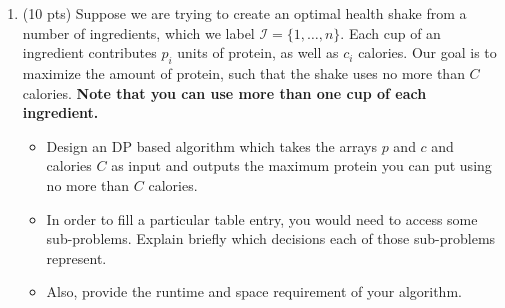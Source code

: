\documentclass[12pt]{article}
\theoremstyle{remark}
\begin{document}
\begin{enumerate}
    
    


\pagebreak



\item (10 pts) Suppose we are trying to create an optimal health shake from a number of ingredients, which we label $\mathcal{I} = \{1, \ldots, n\}$. Each cup of an ingredient contributes $p_{i}$ units of protein, as well as $c_{i}$ calories. Our goal is to maximize the amount of protein, such that the shake uses no more than $C$ calories. \textbf{Note that you can use more than one cup of each ingredient.} 
\begin{itemize}
    \item Design an DP based algorithm which takes the arrays $p$ and $c$ and calories $C$ as input and outputs the maximum protein you can put using no more than $C$ calories.
    \item In order to fill a particular table entry, you would need to access some sub-problems. Explain briefly which decisions each of those sub-problems represent.
    \item Also, provide the runtime and space requirement of your algorithm.
\end{itemize}
 

\end{enumerate}
\end{document}
